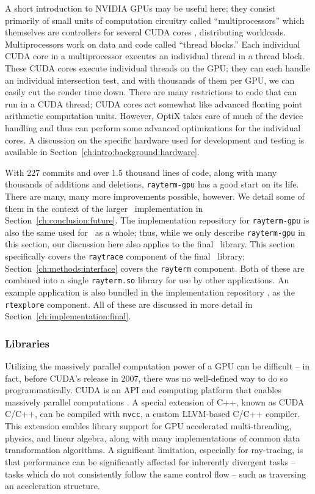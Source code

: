 A short introduction to NVIDIA GPUs may be useful here; they consist primarily of small units of computation circuitry called ``multiprocessors'' which themselves are controllers for several CUDA cores \cite{fermi2009nvidia}, distributing workloads.
Multiprocessors work on data and code called ``thread blocks.''
Each individual CUDA core in a multiprocessor executes an individual thread in a thread block.
These CUDA cores execute individual threads on the GPU; they can each handle an individual intersection test, and with thousands of them per GPU, we can easily cut the render time down.
There are many restrictions to code that can run in a CUDA thread; CUDA cores act somewhat like advanced floating point arithmetic computation units.
However, OptiX takes care of much of the device handling and thus can perform some advanced optimizations for the individual cores.
A discussion on the specific hardware used for development and testing is available in Section~\ref{ch:intro:background:hardware}.

With 227 commits and over 1.5 thousand lines of code, along with many thousands of additions and deletions, \texttt{rayterm-gpu} has a good start on its life.
There are many, many more improvements possible, however.
We detail some of them in the context of the larger \name\ implementation in Section~\ref{ch:conclusion:future}.
The implementation repository for \texttt{rayterm-gpu} \cite{raytermGpuImpl} is also the same used for \name\ as a whole; thus, while we only describe \texttt{rayterm-gpu} in this section, our discussion here also applies to the final \name\ library.
This section specifically covers the \texttt{raytrace} component of the final \name\ library; Section~\ref{ch:methods:interface} covers the \texttt{rayterm} component.
Both of these are combined into a single \texttt{rayterm.so} library for use by other applications.
An example application is also bundled in the implementation repository \cite{raytermGpuImpl}, as the \texttt{rtexplore} component.
All of these are discussed in more detail in Section~\ref{ch:implementation:final}.

\subsubsection{Libraries} \label{ch:methods:renderer:parallel:libraries}

Utilizing the massively parallel computation power of a GPU can be difficult -- in fact, before CUDA's release in 2007, there was no well-defined way to do so programmatically.
CUDA is an API and computing platform that enables massively parallel computations \cite{nvidia2011cuda}.
A special extension of C++, known as CUDA C/C++, can be compiled with \texttt{nvcc}, a custom LLVM-based C/C++ compiler.
This extension enables library support for GPU accelerated multi-threading, physics, and linear algebra, along with many implementations of common data transformation algorithms.
A significant limitation, especially for ray-tracing, is that performance can be significantly affected for inherently divergent tasks -- tasks which do not consistently follow the same control flow -- such as traversing an acceleration structure.

